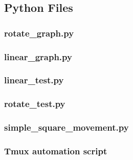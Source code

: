 \documentclass[a4paper, 12pt]{article}
\begin{document}
    \pagebreak
    \subsection{Python Files}
    \subsubsection{rotate\_graph.py}
    
    \pagebreak
    \subsubsection{linear\_graph.py}
    
    \pagebreak
    \subsubsection{linear\_test.py}
    
    \pagebreak
    \subsubsection{rotate\_test.py}
    
    \pagebreak
    \subsubsection{simple\_square\_movement.py}
    
    \pagebreak
    \subsubsection{Tmux automation script} 
    
\end{document}
